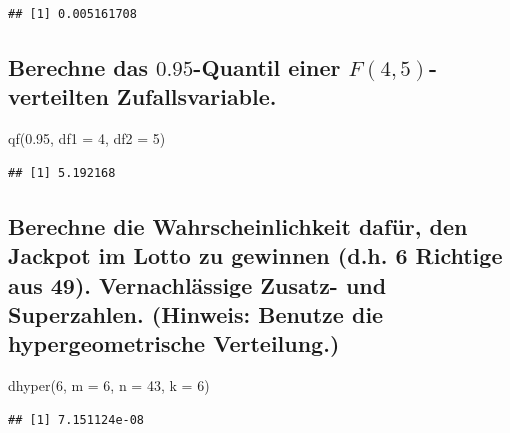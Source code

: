 \documentclass[12pt,a4paper]{article}
\newenvironment{Shaded}{\begin{snugshade}}{\end{snugshade}}
\newcommand{\AttributeTok}[1]{\textcolor[rgb]{0.77,0.63,0.00}{#1}}
\newcommand{\DecValTok}[1]{\textcolor[rgb]{0.00,0.00,0.81}{#1}}
\newcommand{\FloatTok}[1]{\textcolor[rgb]{0.00,0.00,0.81}{#1}}
\newcommand{\FunctionTok}[1]{\textcolor[rgb]{0.00,0.00,0.00}{#1}}
\newcommand{\NormalTok}[1]{#1}
\begin{document}
\begin{verbatim}
## [1] 0.005161708
\end{verbatim}

\hypertarget{berechne-das-0.95-quantil-einer-f4-5-verteilten-zufallsvariable.}{%
\subsection{\texorpdfstring{Berechne das \(0.95\)-Quantil einer
\(F(4, 5)\)-verteilten
Zufallsvariable.}{Berechne das 0.95-Quantil einer F(4, 5)-verteilten Zufallsvariable.}}\label{berechne-das-0.95-quantil-einer-f4-5-verteilten-zufallsvariable.}}

\begin{Shaded}
\begin{Highlighting}[]
    \FunctionTok{qf}\NormalTok{(}\FloatTok{0.95}\NormalTok{, }\AttributeTok{df1 =} \DecValTok{4}\NormalTok{, }\AttributeTok{df2 =} \DecValTok{5}\NormalTok{)}
\end{Highlighting}
\end{Shaded}

\begin{verbatim}
## [1] 5.192168
\end{verbatim}

\hypertarget{berechne-die-wahrscheinlichkeit-dafuxfcr-den-jackpot-im-lotto-zu-gewinnen-d.h.-6-richtige-aus-49.-vernachluxe4ssige-zusatz--und-superzahlen.-hinweis-benutze-die-hypergeometrische-verteilung.}{%
\subsection{Berechne die Wahrscheinlichkeit dafür, den Jackpot im Lotto
zu gewinnen (d.h. 6 Richtige aus 49). Vernachlässige Zusatz- und
Superzahlen. (Hinweis: Benutze die hypergeometrische
Verteilung.)}\label{berechne-die-wahrscheinlichkeit-dafuxfcr-den-jackpot-im-lotto-zu-gewinnen-d.h.-6-richtige-aus-49.-vernachluxe4ssige-zusatz--und-superzahlen.-hinweis-benutze-die-hypergeometrische-verteilung.}}

\begin{Shaded}
\begin{Highlighting}[]
    \FunctionTok{dhyper}\NormalTok{(}\DecValTok{6}\NormalTok{, }\AttributeTok{m =} \DecValTok{6}\NormalTok{, }\AttributeTok{n =} \DecValTok{43}\NormalTok{, }\AttributeTok{k =} \DecValTok{6}\NormalTok{)}
\end{Highlighting}
\end{Shaded}

\begin{verbatim}
## [1] 7.151124e-08
\end{verbatim}
\end{document}

